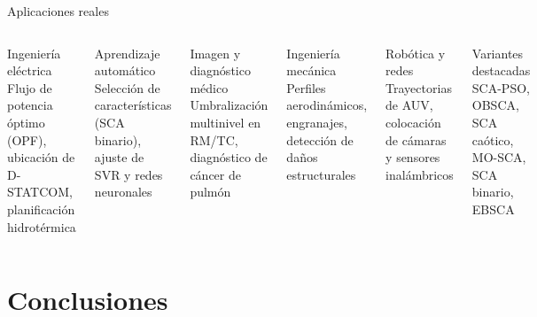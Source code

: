 \documentclass[aspectratio=169, spanish]{beamer}
\begin{document}
\begin{frame}{Aplicaciones reales}
  \begin{columns}[T, onlytextwidth]
      \begin{block}{Ingeniería eléctrica}
        Flujo de potencia óptimo (OPF), ubicación de D-STATCOM, planificación hidrotérmica
      \end{block}
      \vspace{0.3em}
      \begin{block}{Aprendizaje automático}
        Selección de características (SCA binario), ajuste de SVR y redes neuronales
      \end{block}
      \vspace{0.3em}
      \begin{block}{Imagen y diagnóstico médico}
        Umbralización multinivel en RM/TC, diagnóstico de cáncer de pulmón
      \end{block}

      \begin{block}{Ingeniería mecánica}
        Perfiles aerodinámicos, engranajes, detección de daños estructurales
      \end{block}
      \vspace{0.3em}
      \begin{block}{Robótica y redes}
        Trayectorias de AUV, colocación de cámaras y sensores inalámbricos
      \end{block}
      \vspace{0.3em}
      \begin{block}{Variantes destacadas}
        {\small SCA-PSO, OBSCA, SCA caótico, MO-SCA,\\ SCA binario, EBSCA}
      \end{block}
  \end{columns}
\end{frame}

\section{Conclusiones}
\end{document}

